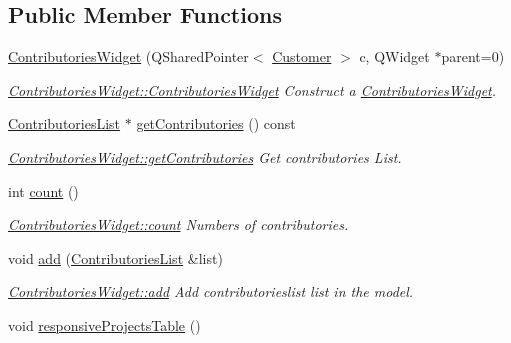 \subsection*{Public Member Functions}
\begin{DoxyCompactItemize}
\item 
\hyperlink{classGui_1_1Widgets_1_1ContributoriesWidget_a5517afc134491eb118b9d183e94476bc}{Contributories\-Widget} (Q\-Shared\-Pointer$<$ \hyperlink{classModels_1_1Customer}{Customer} $>$ c, Q\-Widget $\ast$parent=0)
\begin{DoxyCompactList}\small\item\em \hyperlink{classGui_1_1Widgets_1_1ContributoriesWidget_a5517afc134491eb118b9d183e94476bc}{Contributories\-Widget\-::\-Contributories\-Widget} Construct a \hyperlink{classGui_1_1Widgets_1_1ContributoriesWidget}{Contributories\-Widget}. \end{DoxyCompactList}\item 
\hyperlink{classModels_1_1ContributoriesList}{Contributories\-List} $\ast$ \hyperlink{classGui_1_1Widgets_1_1ContributoriesWidget_a72c0f4a49aaafdf045154bafb1e76049}{get\-Contributories} () const 
\begin{DoxyCompactList}\small\item\em \hyperlink{classGui_1_1Widgets_1_1ContributoriesWidget_a72c0f4a49aaafdf045154bafb1e76049}{Contributories\-Widget\-::get\-Contributories} Get contributories List. \end{DoxyCompactList}\item 
int \hyperlink{classGui_1_1Widgets_1_1ContributoriesWidget_a7c9f1bfcac92d4813f1d43b46319042b}{count} ()
\begin{DoxyCompactList}\small\item\em \hyperlink{classGui_1_1Widgets_1_1ContributoriesWidget_a7c9f1bfcac92d4813f1d43b46319042b}{Contributories\-Widget\-::count} Numbers of contributories. \end{DoxyCompactList}\item 
void \hyperlink{classGui_1_1Widgets_1_1ContributoriesWidget_ae61498391d4aaf199bed8183961d515c}{add} (\hyperlink{classModels_1_1ContributoriesList}{Contributories\-List} \&list)
\begin{DoxyCompactList}\small\item\em \hyperlink{classGui_1_1Widgets_1_1ContributoriesWidget_ae61498391d4aaf199bed8183961d515c}{Contributories\-Widget\-::add} Add contributorieslist {\itshape list} in the model. \end{DoxyCompactList}\item 
\hypertarget{classGui_1_1Widgets_1_1ContributoriesWidget_a734aa654bd463683e900486a6ab27ea1}{void \hyperlink{classGui_1_1Widgets_1_1ContributoriesWidget_a734aa654bd463683e900486a6ab27ea1}{responsive\-Projects\-Table} ()}\label{classGui_1_1Widgets_1_1ContributoriesWidget_a734aa654bd463683e900486a6ab27ea1}


\end{DoxyCompactItemize}

